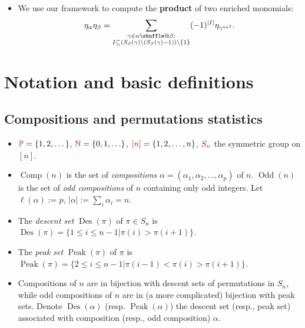 \documentclass[numbers=enddot,12pt,final,onecolumn,notitlepage]{scrartcl}%
\makeatletter
\newcommand{\al}{\alpha}
\newcommand{\be}{\beta}
\newcommand{\NN}{\mathbb{N}} %
\newcommand{\PP}{\mathbb{P}} %
\newcommand{\Des}{\operatorname{Des}}
\newcommand{\Odd}{\operatorname{Odd}}
\newcommand{\Comp}{\operatorname{Comp}}
\newcommand{\Peak}{\operatorname{Peak}}
\providecommand*{\shuffle}{%
  \mathbin{\mathpalette\shuffle@{}}%
}
\newcommand*{\shuffle@}[2]{%
  \sbox0{$#1\vcenter{}$}%
  \kern .15\ht0 %
  \rlap{\vrule height .25\ht0 depth 0pt width 2.5\ht0}%
  \raise.1\ht0\hbox to 2.5\ht0{%
    \vrule height 1.75\ht0 depth -.1\ht0 width .17\ht0 %
    \hfill
    \vrule height 1.75\ht0 depth -.1\ht0 width .17\ht0 %
    \hfill
    \vrule height 1.75\ht0 depth -.1\ht0 width .17\ht0 %
  }%
  \kern .15\ht0 %
}
\newcommand{\defn}[1]{{\color{darkred}\emph{#1}}}
\newcommand{\defnm}[1]{{\color{darkred} #1}}
\newcommand{\0}{\phantom{c}}
\let\sumnonlimits\sum
\renewcommand{\sum}{\sumnonlimits\limits}
\makeatother
\begin{document}
\begin{tcolorbox}[colback=cyan!5,colframe=cyan!75!black, fonttitle=\bfseries,title=Summary of our work]
\begin{itemize}
\item We use our framework to compute the \textbf{product} of two enriched monomials:
\begin{equation*}
\eta_\al \eta_\beta
= \sum_{\substack{\gamma \in \al \shuffle \be ;\\
                   I\subseteq \left(S_{\be}(\gamma)\setminus (S_{\be}(\gamma)-1)\right) \setminus \left\{1\right\}}}
(-1)^{|I|}\eta_{\gamma^{\downarrow\downarrow I}} .
\end{equation*}
\end{itemize}
\end{tcolorbox}

\section{Notation and basic definitions}


\subsection{Compositions and permutations statistics}

\begin{itemize}
\item $\defnm{\PP} =\left\{1,2,\dots\right\}$, $\defnm{\NN} = \left\{0,1,\ldots\right\}$, $\defnm{[n]} = \left\{1,2,\dots, n\right\}$, $\defnm{S_n}$ the symmetric group on $[n]$.

\item \defn{$\Comp(n)$} is the set of \defn{compositions} $\al = (\al_1, \al_2, \dots, \al_p)$ of $n$. \defn{$\Odd(n)$} is the set of \defn{odd compositions} of $n$ containing only odd integers.  Let $\ell(\al) := p$, $|\al| := \sum_i \al_i = n$.

\item The \defn{descent set} $\Des(\pi)$ of $\pi \in S_n$ is 
$\Des(\pi) = \{1\leq i\leq n-1| \pi(i)>\pi(i+1)\}.$


\item The \defn{peak set} $\Peak(\pi)$ of $\pi$ is $
\Peak(\pi) = \{2\leq i\leq n-1| \pi(i-1)<\pi(i)>\pi(i+1)\}.$

\item Compositions of $n$ are in bijection with descent sets of permutations in $S_n$, while odd compositions of $n$ are in (a more complicated) bijection with peak sets. Denote \defn{$\Des(\al)$} (resp. \defn{$\Peak(\al)$}) the descent set (resp., peak set) associated with composition (resp., odd composition) $\al$.

\end{itemize}
\end{document}
